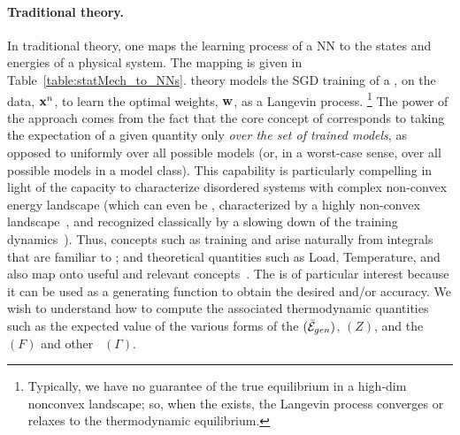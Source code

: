 \paragraph{Traditional \SMOG theory.}
In traditional \SMOG theory, one maps the learning process of a NN to the states and energies of a physical system.
The mapping is given in Table~\ref{table:statMech_to_NNs}.
\SMOG theory models the SGD training of a \emph{\Perceptron}, on the data, $\mathbf{x}^{n}$, to learn the optimal weights, ${\mathbf{w}}$, as a Langevin process.%
\footnote{Typically, we have no guarantee of the true equilibrium in a high‐dim nonconvex landscape; so,
when the \emph{\ThermodynamicLimit} exists,
the  Langevin process converges or relaxes to the thermodynamic equilibrium.}
The power of the \STATMECH approach comes from the fact that the core concept of \ThermalAverages corresponds to taking the expectation of a given quantity only \emph{over the set of trained models}, as opposed to uniformly over all possible models (or, in a worst-case sense, over all possible models in a model class).
This capability is particularly compelling in light of the \STATMECH capacity to characterize disordered 
systems with complex non-convex energy landscape (which can even be \emph{\Glassy}, characterized by a
highly non-convex landscape~\cite{SST92, STS90, engel2001statistical},
and recognized classically by a slowing down of the training dynamics~\cite{gutfreund1985spin}).
Thus, concepts such as training and \GeneralizationError arise naturally from integrals that are familiar to \STATMECH; 
and theoretical quantities such as Load, Temperature, and \FreeEnergy also map onto useful and relevant concepts~\cite{MM17_TR}. 
The \FreeEnergy is of particular interest because it can be used as a generating function to obtain the desired \GeneralizationError and/or accuracy.
We wish to understand how to compute the associated thermodynamic quantities such as the expected value of the
various forms of the \AverageGeneralizationError $(\bar{\mathcal{E}}_{gen})$, \PartitionFunction $(Z)$, and the
\FreeEnergy $(F)$ and other \GeneratingFunctions~$(\Gamma)$.



